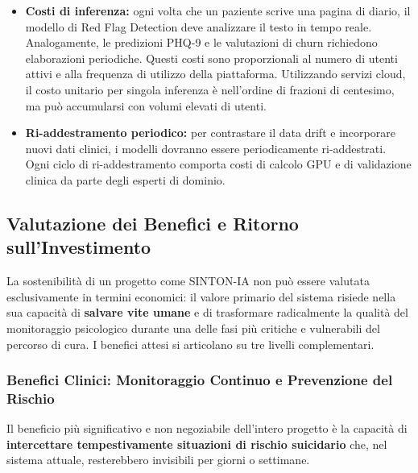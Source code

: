 \begin{itemize}
    \item \textbf{Costi di inferenza:} ogni volta che un paziente scrive una pagina di diario, il modello di Red Flag Detection deve analizzare il testo in tempo reale. Analogamente, le predizioni PHQ-9 e le valutazioni di churn richiedono elaborazioni periodiche. Questi costi sono proporzionali al numero di utenti attivi e alla frequenza di utilizzo della piattaforma. Utilizzando servizi cloud, il costo unitario per singola inferenza è nell'ordine di frazioni di centesimo, ma può accumularsi con volumi elevati di utenti.


    \item \textbf{Ri-addestramento periodico:} per contrastare il data drift e incorporare nuovi dati clinici, i modelli dovranno essere periodicamente ri-addestrati. Ogni ciclo di ri-addestramento comporta costi di calcolo GPU e di validazione clinica da parte degli esperti di dominio.
\end{itemize}

\clearpage
\subsection{Valutazione dei Benefici e Ritorno sull'Investimento}
\label{subsec:benefici_roi}

La sostenibilità di un progetto come SINTON-IA non può essere valutata esclusivamente in termini economici: il valore primario del sistema risiede nella sua capacità di \textbf{salvare vite umane} e di trasformare radicalmente la qualità del monitoraggio psicologico durante una delle fasi più critiche e vulnerabili del percorso di cura. I benefici attesi si articolano su tre livelli complementari.

\subsubsection{Benefici Clinici: Monitoraggio Continuo e Prevenzione del Rischio}
\label{subsubsec:benefici_clinici}

Il beneficio più significativo e non negoziabile dell'intero progetto è la capacità di \textbf{intercettare tempestivamente situazioni di rischio suicidario} che, nel sistema attuale, resterebbero invisibili per giorni o settimane.

